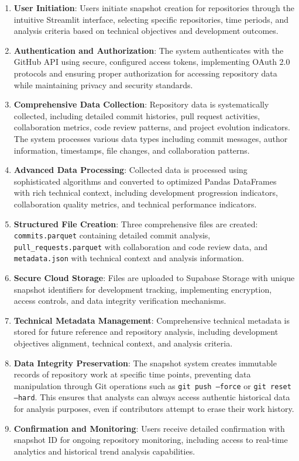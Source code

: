 \documentclass[12pt,a4paper]{article}
\begin{document}
\begin{enumerate}
\item \textbf{User Initiation}: Users initiate snapshot creation for repositories through the intuitive Streamlit interface, selecting specific repositories, time periods, and analysis criteria based on technical objectives and development outcomes.

\item \textbf{Authentication and Authorization}: The system authenticates with the GitHub API using secure, configured access tokens, implementing OAuth 2.0 protocols and ensuring proper authorization for accessing repository data while maintaining privacy and security standards.

\item \textbf{Comprehensive Data Collection}: Repository data is systematically collected, including detailed commit histories, pull request activities, collaboration metrics, code review patterns, and project evolution indicators. The system processes various data types including commit messages, author information, timestamps, file changes, and collaboration patterns.

\item \textbf{Advanced Data Processing}: Collected data is processed using sophisticated algorithms and converted to optimized Pandas DataFrames with rich technical context, including development progression indicators, collaboration quality metrics, and technical performance indicators.

\item \textbf{Structured File Creation}: Three comprehensive files are created: \texttt{commits.parquet} containing detailed commit analysis, \texttt{pull\_requests.parquet} with collaboration and code review data, and \texttt{metadata.json} with technical context and analysis information.

\item \textbf{Secure Cloud Storage}: Files are uploaded to Supabase Storage with unique snapshot identifiers for development tracking, implementing encryption, access controls, and data integrity verification mechanisms.

\item \textbf{Technical Metadata Management}: Comprehensive technical metadata is stored for future reference and repository analysis, including development objectives alignment, technical context, and analysis criteria.

\item \textbf{Data Integrity Preservation}: The snapshot system creates immutable records of repository work at specific time points, preventing data manipulation through Git operations such as \texttt{git push --force} or \texttt{git reset --hard}. This ensures that analysts can always access authentic historical data for analysis purposes, even if contributors attempt to erase their work history.

\item \textbf{Confirmation and Monitoring}: Users receive detailed confirmation with snapshot ID for ongoing repository monitoring, including access to real-time analytics and historical trend analysis capabilities.
\end{enumerate}
\end{document}
